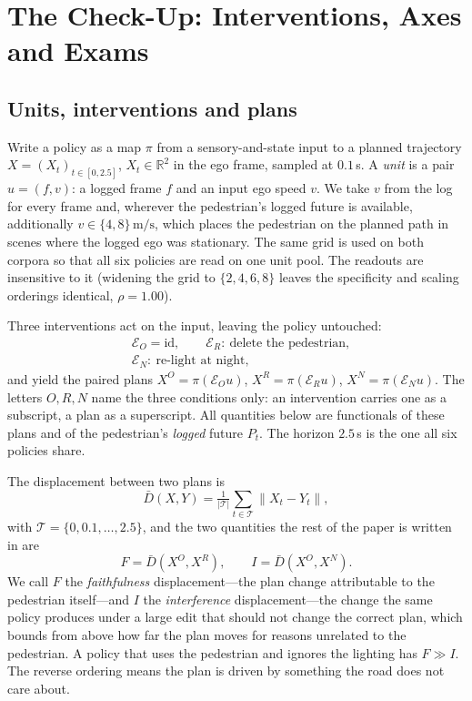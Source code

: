 \section{The Check-Up: Interventions, Axes and Exams}
\label{sec:checkup}

\subsection{Units, interventions and plans}
Write a policy as a map $\pi$ from a sensory-and-state input to a planned trajectory
$X=(X_t)_{t\in[0,2.5]}$, $X_t\in\mathbb{R}^2$ in the ego frame, sampled at $0.1$\,s. A \emph{unit} is a
pair $u=(f,v)$: a logged frame $f$ and an input ego speed $v$. We take $v$ from the log for every
frame and, wherever the pedestrian's logged future is available, additionally
$v\in\{4,8\}\,\mathrm{m/s}$, which places the pedestrian on the planned path in scenes where the logged
ego was stationary. The same grid is used on both corpora so that all six policies are read on one
unit pool. The readouts are insensitive to it (widening the grid to $\{2,4,6,8\}$ leaves the
specificity and scaling orderings identical, $\rho=1.00$).

Three interventions act on the input, leaving the policy untouched:
\begin{equation}
\begin{aligned}
&\mathcal{E}_O=\mathrm{id},\qquad \mathcal{E}_R:\ \text{delete the pedestrian},\\
&\mathcal{E}_N:\ \text{re-light at night},
\end{aligned}
\label{eq:interventions}
\end{equation}
and yield the paired plans $X^{O}=\pi(\mathcal{E}_O u)$, $X^{R}=\pi(\mathcal{E}_R u)$,
$X^{N}=\pi(\mathcal{E}_N u)$. The letters $O,R,N$ name the three conditions only: an intervention carries one as a subscript, a plan as a superscript. All quantities below are functionals of
these plans and of the
pedestrian's \emph{logged} future $P_t$. The horizon $2.5$\,s is the one all six policies share.

The displacement between two plans is
\begin{equation}
\bar D(X,Y)=\tfrac{1}{|\mathcal{T}|}\textstyle\sum_{t\in\mathcal{T}}\|X_t-Y_t\|,
\label{eq:disp}
\end{equation}
with $\mathcal{T}=\{0,0.1,\dots,2.5\}$, and the two quantities the rest of the paper is written in are
\begin{equation}
F=\bar D(X^{O},X^{R}),\qquad I=\bar D(X^{O},X^{N}).
\label{eq:FI}
\end{equation}
We call $F$ the \emph{faithfulness} displacement---the plan change attributable to the pedestrian
itself---and $I$ the \emph{interference} displacement---the change the same policy produces under a large edit that should not change the correct plan, which bounds from above how far the plan moves for reasons unrelated to the pedestrian. A policy that
uses the pedestrian and ignores the lighting has $F\gg I$. The reverse ordering means the plan is
driven by something the road does not care about.

